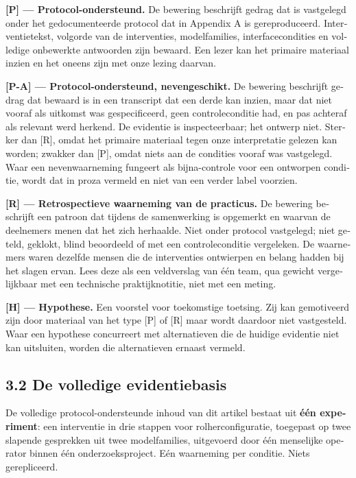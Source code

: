 \begin{dutch}
\textbf{[P] — Protocol-ondersteund.} De bewering beschrijft gedrag dat is vastgelegd onder het gedocumenteerde protocol dat in Appendix A is gereproduceerd. Interventietekst, volgorde van de interventies, modelfamilies, interfacecondities en volledige onbewerkte antwoorden zijn bewaard. Een lezer kan het primaire materiaal inzien en het oneens zijn met onze lezing daarvan.

\textbf{[P-A] — Protocol-ondersteund, nevengeschikt.} De bewering beschrijft gedrag dat bewaard is in een transcript dat een derde kan inzien, maar dat niet vooraf als uitkomst was gespecificeerd, geen controleconditie had, en pas achteraf als relevant werd herkend. De evidentie is inspecteerbaar; het ontwerp niet. Sterker dan [R], omdat het primaire materiaal tegen onze interpretatie gelezen kan worden; zwakker dan [P], omdat niets aan de condities vooraf was vastgelegd. Waar een nevenwaarneming fungeert als bijna-controle voor een ontworpen conditie, wordt dat in proza vermeld en niet van een verder label voorzien.

\textbf{[R] — Retrospectieve waarneming van de practicus.} De bewering beschrijft een patroon dat tijdens de samenwerking is opgemerkt en waarvan de deelnemers menen dat het zich herhaalde. Niet onder protocol vastgelegd; niet geteld, geklokt, blind beoordeeld of met een controleconditie vergeleken. De waarnemers waren dezelfde mensen die de interventies ontwierpen en belang hadden bij het slagen ervan. Lees deze als een veldverslag van één team, qua gewicht vergelijkbaar met een technische praktijknotitie, niet met een meting.

\textbf{[H] — Hypothese.} Een voorstel voor toekomstige toetsing. Zij kan gemotiveerd zijn door materiaal van het type [P] of [R] maar wordt daardoor niet vastgesteld. Waar een hypothese concurreert met alternatieven die de huidige evidentie niet kan uitsluiten, worden die alternatieven ernaast vermeld.


\subsection*{3.2 De volledige evidentiebasis}
\label{sec:nl:3.2}

De volledige protocol-ondersteunde inhoud van dit artikel bestaat uit \textbf{één experiment}: een interventie in drie stappen voor rolherconfiguratie, toegepast op twee slapende gesprekken uit twee modelfamilies, uitgevoerd door één menselijke operator binnen één onderzoeksproject. Eén waarneming per conditie. Niets gerepliceerd.


\end{dutch}
